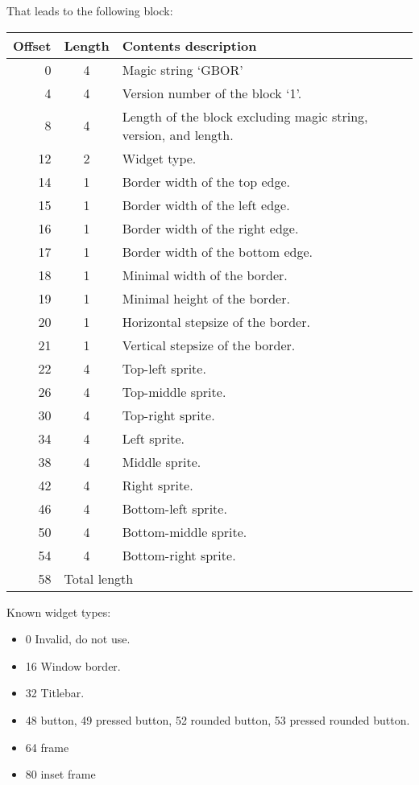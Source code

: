 \documentclass{article}
\begin{document}
That leads to the following block:
\begin{center}
\begin{tabular}{|r|c|l|} \hline
\textbf{Offset} & \textbf{Length} & \textbf{Contents description} \\ \hline
   0 &  4 & Magic string `GBOR' \\
   4 &  4 & Version number of the block `1'. \\
   8 &  4 & Length of the block excluding magic string, version, and length. \\
  12 &  2 & Widget type. \\
  14 &  1 & Border width of the top edge. \\
  15 &  1 & Border width of the left edge. \\
  16 &  1 & Border width of the right edge. \\
  17 &  1 & Border width of the bottom edge. \\
  18 &  1 & Minimal width of the border. \\
  19 &  1 & Minimal height of the border. \\
  20 &  1 & Horizontal stepsize of the border. \\
  21 &  1 & Vertical stepsize of the border. \\
  22 &  4 & Top-left sprite. \\
  26 &  4 & Top-middle sprite. \\
  30 &  4 & Top-right sprite. \\
  34 &  4 & Left sprite. \\
  38 &  4 & Middle sprite. \\
  42 &  4 & Right sprite. \\
  46 &  4 & Bottom-left sprite. \\
  50 &  4 & Bottom-middle sprite. \\
  54 &  4 & Bottom-right sprite. \\
  58 & \multicolumn{2}{l|}{Total length} \\ \hline
\end{tabular}
\end{center}

Known widget types:
\begin{itemize}
\item 0 Invalid, do not use.
\item 16 Window border.
\item 32 Titlebar.
\item 48 button,
      49 pressed button,
      52 rounded button,
      53 pressed rounded button.
\item 64 frame
\item 80 inset frame
\end{itemize}
\end{document}
